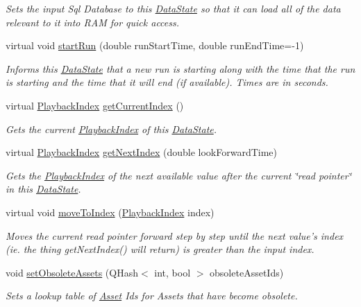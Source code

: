 \begin{DoxyCompactItemize}
\begin{DoxyCompactList}\small\item\em Sets the input Sql Database to this \hyperlink{class_picto_1_1_data_state}{Data\-State} so that it can load all of the data relevant to it into R\-A\-M for quick access. \end{DoxyCompactList}\item 
virtual void \hyperlink{class_picto_1_1_property_state_a737fa799240ff3025a8e6e1949d78fc6}{start\-Run} (double run\-Start\-Time, double run\-End\-Time=-\/1)
\begin{DoxyCompactList}\small\item\em Informs this \hyperlink{class_picto_1_1_data_state}{Data\-State} that a new run is starting along with the time that the run is starting and the time that it will end (if available). Times are in seconds. \end{DoxyCompactList}\item 
virtual \hyperlink{struct_picto_1_1_playback_index}{Playback\-Index} \hyperlink{class_picto_1_1_property_state_a395f83f41df4683d0ebe5d5d6cc56554}{get\-Current\-Index} ()
\begin{DoxyCompactList}\small\item\em Gets the current \hyperlink{struct_picto_1_1_playback_index}{Playback\-Index} of this \hyperlink{class_picto_1_1_data_state}{Data\-State}. \end{DoxyCompactList}\item 
virtual \hyperlink{struct_picto_1_1_playback_index}{Playback\-Index} \hyperlink{class_picto_1_1_property_state_a416c0397bca9089ddcc2d5ba931c004c}{get\-Next\-Index} (double look\-Forward\-Time)
\begin{DoxyCompactList}\small\item\em Gets the \hyperlink{struct_picto_1_1_playback_index}{Playback\-Index} of the next available value after the current \char`\"{}read pointer\char`\"{} in this \hyperlink{class_picto_1_1_data_state}{Data\-State}. \end{DoxyCompactList}\item 
virtual void \hyperlink{class_picto_1_1_property_state_ab6fd8407780b65caf4a1177c799c8c28}{move\-To\-Index} (\hyperlink{struct_picto_1_1_playback_index}{Playback\-Index} index)
\begin{DoxyCompactList}\small\item\em Moves the current read pointer forward step by step until the next value's index (ie. the thing get\-Next\-Index() will return) is greater than the input index. \end{DoxyCompactList}\item 
void \hyperlink{class_picto_1_1_property_state_adfe617b2617ed924a8cddf2f0a49c400}{set\-Obsolete\-Assets} (Q\-Hash$<$ int, bool $>$ obsolete\-Asset\-Ids)
\begin{DoxyCompactList}\small\item\em Sets a lookup table of \hyperlink{class_picto_1_1_asset}{Asset} Ids for Assets that have become obsolete. \end{DoxyCompactList}\end{DoxyCompactItemize}


